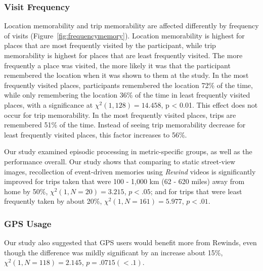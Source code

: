 \documentclass{sigchi}
\begin{document}
\subsubsection{Visit Frequency}
Location memorability and trip memorability are affected differently by frequency of visits (Figure~\ref{fig:frequencymemory}). Location memorability is highest for places that are most frequently visited by the participant, while trip memorability is highest for places that are least frequently visited. The more frequently a place was visited, the more likely it was that the participant remembered the location when it was shown to them at the study. In the most frequently visited places, participants remembered the location 72\% of the time, while only remembering the location 36\% of the time in least frequently visited places, with a significance at $\chi^2(1,128) = 14.458$, p < 0.01. This effect does not occur for trip memorability. In the most frequently visited places, trips are remembered 51\% of the time. Instead of seeing trip memorability decrease for least frequently visited places, this factor increases to 56\%.

Our study examined episodic processing in metric-specific groups, as well as the performance overall. Our study shows that comparing to static street-view images, recollection of event-driven memories using \textit{Rewind} videos is significantly improved for trips taken that were 100 - 1,000 km (62 - 620 miles) away from home by 50\%, $\chi^2(1, N=20) = 3.215$, $p <.05$; and for trips that were least frequently taken by about 20\%, $\chi^2(1, N=161) = 5.977$, $p <.01$. 

\subsubsection{GPS Usage}
Our study also suggested that GPS users would benefit more from Rewinds, even though the difference was mildly significant by an increase about 15\%, $\chi^2(1, N=118) = 2.145$, $p = .0715 (<.1)$. 
\end{document}
